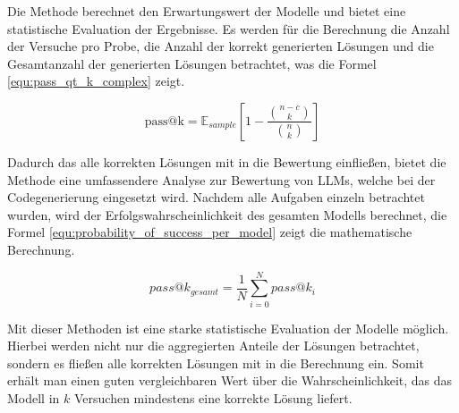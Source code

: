 Die Methode berechnet den Erwartungswert der Modelle und bietet eine statistische Evaluation der Ergebnisse. Es werden für die Berechnung die Anzahl der Versuche pro Probe, die Anzahl der korrekt generierten Lösungen und die Gesamtanzahl der generierten Lösungen betrachtet, was die Formel \ref{equ:pass_qt_k_complex} zeigt.\vspace{0.2cm}

\begin{equation}\label{equ:pass_qt_k_complex}
	\text{pass@k} = \mathbb{E}_{sample} \left[ 1 - \frac{\binom{n-c}{k}}{\binom{n}{k}}\right]
\end{equation}

Dadurch das alle korrekten Lösungen mit in die Bewertung einfließen, bietet die Methode eine umfassendere Analyse zur Bewertung von LLMs, welche bei der Codegenerierung eingesetzt wird. Nachdem alle Aufgaben einzeln betrachtet wurden, wird der Erfolgswahrscheinlichkeit des gesamten Modells berechnet, die Formel \ref{equ:probability_of_success_per_model} zeigt die mathematische Berechnung.

\begin{equation}\label{equ:probability_of_success_per_model}
	pass@k_{gesamt} = \frac{1}{N} \sum_{i=0}^{N} pass@k_{i}
\end{equation}

Mit dieser Methoden ist eine starke statistische Evaluation der Modelle möglich. Hierbei werden nicht nur die aggregierten Anteile der Lösungen betrachtet, sondern es fließen alle korrekten Lösungen mit in die Berechnung ein. Somit erhält man einen guten vergleichbaren Wert über die Wahrscheinlichkeit, das das Modell in $k$ Versuchen mindestens eine korrekte Lösung liefert.

